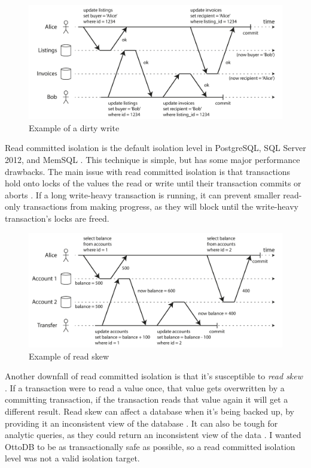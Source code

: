 \documentclass[conference]{IEEEtran}
\begin{document}
    \begin{figure}[h]
        \centering
        \includegraphics[width=\columnwidth]{figures/DirtyWrite.png}
        \caption{Example of a dirty write \cite[p. 236]{b18}}
        \end{figure}

    Read committed isolation is the default isolation level in PostgreSQL, SQL Server 2012, and MemSQL \cite[p. 236]{b18}. This technique is simple, but has some major performance drawbacks. The main issue with read committed isolation is that transactions hold onto locks of the values the read or write until their transaction commits or aborts \cite[p. 236]{b18}. If a long write-heavy transaction is running, it can prevent smaller read-only transactions from making progress, as they will block until the write-heavy transaction's locks are freed.

    \begin{figure}[h]
        \centering
        \includegraphics[width=\columnwidth]{figures/ReadSkew.png}
        \caption{Example of read skew \cite[p. 237]{b18}}
        \end{figure}

    Another downfall of read committed isolation is that it's susceptible to \textit{read skew} \cite[p. 237]{b18}. If a transaction were to read a value once, that value gets overwritten by a committing transaction, if the transaction reads that value again it will get a different result. Read skew can affect a database when it's being backed up, by providing it an inconsistent view of the database \cite[p. 237]{b18}. It can also be tough for analytic queries, as they could return an inconsistent view of the data \cite[p. 237]{b18}. I wanted OttoDB to be as transactionally safe as possible, so a read committed isolation level was not a valid isolation target.
\end{document}
